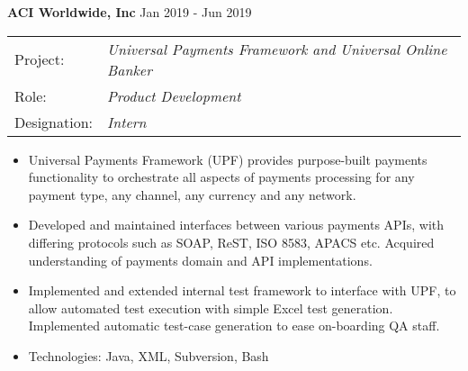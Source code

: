 \documentclass[a4paper]{article}
\begin{document}
\textbf{ACI Worldwide, Inc}  \hfill Jan 2019 - Jun 2019\\
\begin{tabular}{ l l }
Project: & \textit{Universal Payments Framework and Universal Online Banker } \\
Role: & \textit{Product Development} \\
Designation: & \textit{Intern} \\
\end{tabular}
\vspace{-1mm}
\begin{itemize} \itemsep 1pt
	\item Universal Payments Framework (UPF) provides purpose-built payments functionality to orchestrate all aspects of payments processing for any payment type, any channel, any currency and any network.
	\item Developed and maintained interfaces between various payments APIs, with differing protocols such as SOAP, ReST, ISO 8583, APACS etc. Acquired understanding of payments domain and API implementations.
	\item Implemented and extended internal test framework to interface with UPF, to allow automated test execution with simple Excel test generation. Implemented automatic test-case generation to ease on-boarding QA staff.
	\item Technologies: Java, XML, Subversion, Bash
\end{itemize}
\end{document}
